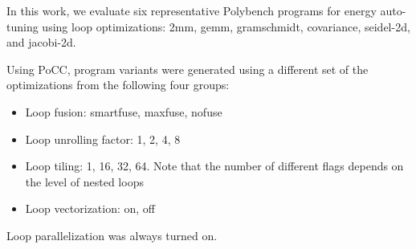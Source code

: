 In this work, we evaluate six representative Polybench programs for energy auto-tuning using
loop optimizations: 2mm, gemm, gramschmidt, covariance, seidel-2d, and jacobi-2d.

Using PoCC, program variants were generated using
a different set of the 
optimizations from the following four groups: 
\begin{itemize}
    \item Loop fusion: smartfuse, maxfuse, nofuse
    \item Loop unrolling factor: 1, 2, 4, 8
    \item Loop tiling: 1, 16, 32, 64. Note that the number of different flags
 depends on the level of nested loops   
    \item Loop vectorization: on, off
\end{itemize}
Loop parallelization was always turned on.
